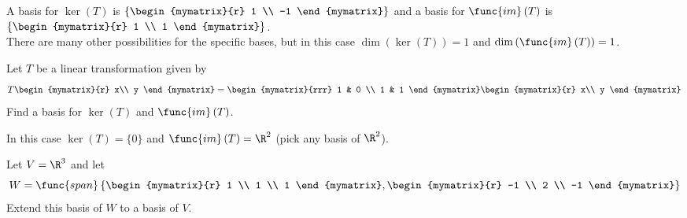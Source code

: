 \begin{enumialphparenastyle}
\begin{ex}
\begin{sol}
A basis for $\ker \left( T\right)$ is 
$\left\{ \begin{mymatrix}{r}
1 \\ 
-1 
\end{mymatrix} \right\}$ 
and a basis for $\func{im} \left( T\right)$ is 
$\left\{ \begin{mymatrix}{r}
1 \\ 
1 
\end{mymatrix} \right\}$. \\
There are many other possibilities for the specific bases, but in this case 
$\dim \left( \ker \left( T\right) \right)=1 $ and $\dim \left( \func{im} \left( T\right) \right)=1$.
\end{sol}

\end{ex}


\begin{ex}
 Let $T$ be a linear transformation given by 
\[
T \begin{mymatrix}{r}
x\\
y
\end{mymatrix} = \begin{mymatrix}{rrr}
1 & 0  \\
1 & 1
\end{mymatrix}
\begin{mymatrix}{r}
x\\
y
\end{mymatrix}
\]
Find a basis for $\ker \left( T\right)$ and $\func{im}
\left( T\right) $.

\begin{sol}
In this case $\ker \left( T\right) =\{0\}$ 
and $\func{im} \left( T\right) = \R^2$ (pick any basis of $\R^2$). 
\end{sol}

\end{ex}



\begin{ex}
Let $V=\R^{3}$ and let 
\begin{equation*}
W=\func{span}\left\{ \begin{mymatrix}{r}
1 \\ 
1 \\ 
1
\end{mymatrix} ,\begin{mymatrix}{r}
-1 \\ 
2 \\ 
-1
\end{mymatrix} \right\}
\end{equation*}
Extend this basis of $W$ to a basis of $V$.


\end{ex}
\end{enumialphparenastyle}
